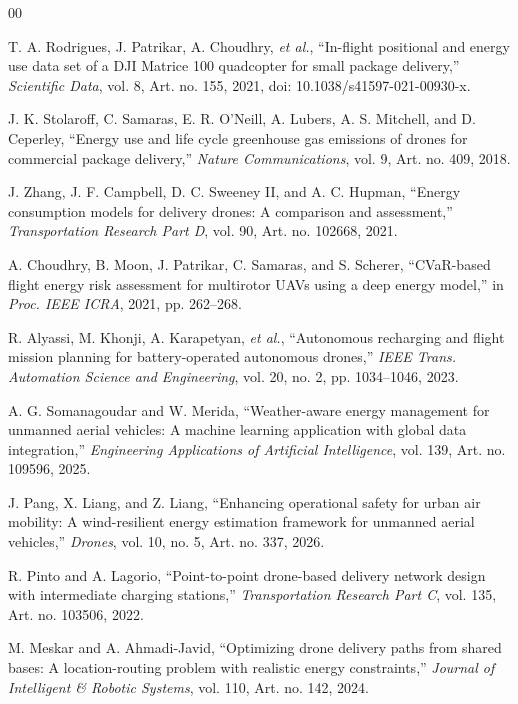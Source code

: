 \documentclass[conference,a4paper]{IEEEtran}
\begin{document}
\begin{thebibliography}{00}

 T. A. Rodrigues, J. Patrikar, A. Choudhry, \emph{et al.}, ``In-flight positional and energy use data set of a DJI Matrice 100 quadcopter for small package delivery,'' \emph{Scientific Data}, vol. 8, Art. no. 155, 2021, doi: 10.1038/s41597-021-00930-x.

 J. K. Stolaroff, C. Samaras, E. R. O'Neill, A. Lubers, A. S. Mitchell, and D. Ceperley, ``Energy use and life cycle greenhouse gas emissions of drones for commercial package delivery,'' \emph{Nature Communications}, vol. 9, Art. no. 409, 2018.

 J. Zhang, J. F. Campbell, D. C. Sweeney II, and A. C. Hupman, ``Energy consumption models for delivery drones: A comparison and assessment,'' \emph{Transportation Research Part D}, vol. 90, Art. no. 102668, 2021.

 A. Choudhry, B. Moon, J. Patrikar, C. Samaras, and S. Scherer, ``CVaR-based flight energy risk assessment for multirotor UAVs using a deep energy model,'' in \emph{Proc. IEEE ICRA}, 2021, pp. 262--268.

 R. Alyassi, M. Khonji, A. Karapetyan, \emph{et al.}, ``Autonomous recharging and flight mission planning for battery-operated autonomous drones,'' \emph{IEEE Trans. Automation Science and Engineering}, vol. 20, no. 2, pp. 1034--1046, 2023.

 A. G. Somanagoudar and W. Merida, ``Weather-aware energy management for unmanned aerial vehicles: A machine learning application with global data integration,'' \emph{Engineering Applications of Artificial Intelligence}, vol. 139, Art. no. 109596, 2025.

 J. Pang, X. Liang, and Z. Liang, ``Enhancing operational safety for urban air mobility: A wind-resilient energy estimation framework for unmanned aerial vehicles,'' \emph{Drones}, vol. 10, no. 5, Art. no. 337, 2026.

 R. Pinto and A. Lagorio, ``Point-to-point drone-based delivery network design with intermediate charging stations,'' \emph{Transportation Research Part C}, vol. 135, Art. no. 103506, 2022.

 M. Meskar and A. Ahmadi-Javid, ``Optimizing drone delivery paths from shared bases: A location-routing problem with realistic energy constraints,'' \emph{Journal of Intelligent \& Robotic Systems}, vol. 110, Art. no. 142, 2024.


\end{thebibliography}
\end{document}
